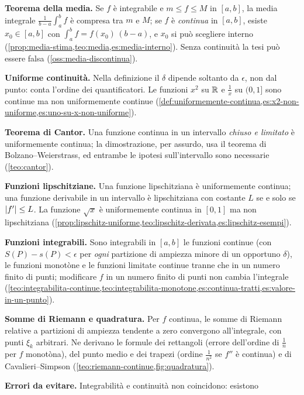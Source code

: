 \begin{puntichiave}
\item \textbf{Teorema della media.} Se $f$ è integrabile e $m\le f\le M$ in $[a,b]$, la
media integrale $\frac1{b-a}\int_{a}^{b}f$ è compresa tra $m$ e $M$; se $f$ è
\emph{continua} in $[a,b]$, esiste $x_{0}\in[a,b]$ con
$\int_{a}^{b}f=f(x_{0})\,(b-a)$, e $x_{0}$ si può scegliere interno
(\cref{prop:media-stima,teo:media,es:media-interno}). Senza continuità la tesi può
essere falsa (\cref{oss:media-discontinua}).
\item \textbf{Uniforme continuità.} Nella definizione il $\delta$ dipende soltanto da
$\epsilon$, non dal punto: conta l'ordine dei quantificatori. Le funzioni $x^{2}$ su
$\mathbb{R}$ e $\frac1x$ su $(0,1]$ sono continue ma non uniformemente continue
(\cref{def:uniformemente-continua,es:x2-non-uniforme,es:uno-su-x-non-uniforme}).
\item \textbf{Teorema di Cantor.} Una funzione continua in un intervallo
\emph{chiuso e limitato} è uniformemente continua; la dimostrazione, per assurdo, usa
il teorema di Bolzano--Weierstrass, ed entrambe le ipotesi sull'intervallo sono
necessarie (\cref{teo:cantor}).
\item \textbf{Funzioni lipschitziane.} Una funzione lipschitziana è uniformemente
continua; una funzione derivabile in un intervallo è lipschitziana con costante $L$ se
e solo se $\lvert f'\rvert\le L$. La funzione $\sqrt x$ è uniformemente continua in $[0,1]$ ma
non lipschitziana
(\cref{prop:lipschitz-uniforme,teo:lipschitz-derivata,es:lipschitz-esempi}).
\item \textbf{Funzioni integrabili.} Sono integrabili in $[a,b]$ le funzioni continue
(con $S(P)-s(P)<\epsilon$ per \emph{ogni} partizione di ampiezza minore di un
opportuno $\delta$), le funzioni monotòne e le funzioni limitate continue tranne che in
un numero finito di punti; modificare $f$ in un numero finito di punti non cambia
l'integrale
(\cref{teo:integrabilita-continue,teo:integrabilita-monotone,es:continua-tratti,es:valore-in-un-punto}).
\item \textbf{Somme di Riemann e quadratura.} Per $f$ continua, le somme di Riemann
relative a partizioni di ampiezza tendente a zero convergono all'integrale, con punti
$\xi_{k}$ arbitrari. Ne derivano le formule dei rettangoli (errore dell'ordine di
$\frac1n$ per $f$ monotòna), del punto medio e dei trapezi (ordine $\frac1{n^{2}}$ se
$f''$ è continua) e di Cavalieri--Simpson (\cref{teo:riemann-continue,fig:quadratura}).
\item \textbf{Errori da evitare.} Integrabilità e continuità non coincidono: esistono

\end{puntichiave}

